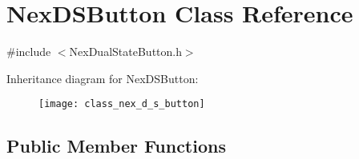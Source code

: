 \hypertarget{class_nex_d_s_button}{\section{Nex\+D\+S\+Button Class Reference}
\label{class_nex_d_s_button}
}


{\ttfamily \#include $<$Nex\+Dual\+State\+Button.\+h$>$}

Inheritance diagram for Nex\+D\+S\+Button\+:\begin{figure}[H]
\begin{center}
\leavevmode
\texttt{[image: class\_nex\_d\_s\_button]}
\end{center}
\end{figure}
\subsection*{Public Member Functions}

